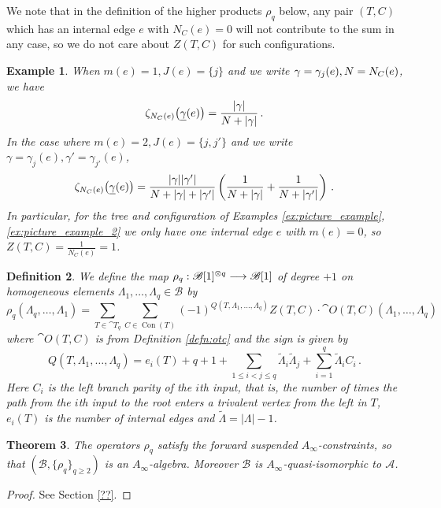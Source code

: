 \documentclass[english,letter paper,12pt,leqno]{article}
\newtheorem{theorem}{Theorem}[section]
\theoremstyle{example}
\newtheorem{definition}[theorem]{Definition}
\newtheorem{example}[theorem]{Example}
\numberwithin{equation}{section}
\def\be{\begin{equation}}
\def\ee{\end{equation}}
\begin{document}
We note that in the definition of the higher products $\rho_q$ below, any pair $(T,C)$ which has an internal edge $e$ with $N_C(e) = 0$ will not contribute to the sum in any case, so we do not care about $Z(T,C)$ for such configurations.

\begin{example} When $m(e) = 1, J(e) = \{ j \}$ and we write $\gamma = \gamma_j(e), N = N_C(e)$, we have
\[
\zeta_{N_C(e)}\big( \underline{\gamma}(e) \big) = \frac{|\gamma|}{N + |\gamma|}\,.
\]
In the case where $m(e) = 2, J(e) = \{ j, j' \}$ and we write $\gamma = \gamma_j(e), \gamma' = \gamma_{j'}(e)$,
\[
\zeta_{N_C(e)}\big( \underline{\gamma}(e) \big) = \frac{|\gamma||\gamma'|}{N + |\gamma| + |\gamma'|} \left( \frac{1}{N + |\gamma|}  + \frac{1}{N + |\gamma'|}\right)\,.
\]
In particular, for the tree and configuration of Examples \ref{ex:picture_example}, \ref{ex:picture_example_2} we only have one internal edge $e$ with $m(e) = 0$, so $Z(T,C) = \frac{1}{N_C(e)} = 1$.
\end{example}

\begin{definition}\label{defn:bainf} We define the map $\rho_q: \mathscr{B}[1]^{\otimes q} \longrightarrow \mathscr{B}[1]$ of degree $+1$ on homogeneous elements $\Lambda_1,\ldots,\Lambda_q \in \mathscr{B}$ by
\[
\rho_q( \Lambda_q, \ldots, \Lambda_1 ) = \sum_{T \in \cat{T}_q} \sum_{C \in \operatorname{Con}(T)} (-1)^{Q(T, \Lambda_1, \ldots, \Lambda_q)} Z(T,C) \cdot \cat{O}(T, C)( \Lambda_1, \ldots, \Lambda_q )
\]
where $\cat{O}(T,C)$ is from Definition \ref{defn:otc} and the sign is given by
\be\label{eq:defnQsign}
Q(T, \Lambda_1, \ldots, \Lambda_q) = e_i(T) + q + 1 + \sum_{1 \le i < j \le q} \widetilde{\Lambda}_i \widetilde{\Lambda}_j + \sum_{i=1}^q \widetilde{\Lambda}_i C_i\,.
\ee
Here $C_i$ is the \emph{left branch parity} of the $i$th input, that is, the number of times the path from the $i$th input to the root enters a trivalent vertex from the left in $T$, $e_i(T)$ is the number of internal edges and $\widetilde{\Lambda} = |\Lambda| - 1$.
\end{definition}

\begin{theorem} The operators $\rho_q$ satisfy the forward suspended $A_\infty$-constraints, so that $(\mathscr{B}, \{ \rho_q \}_{q \ge 2})$ is an $A_\infty$-algebra. Moreover $\mathscr{B}$ is $A_\infty$-quasi-isomorphic to $\mathscr{A}$.
\end{theorem}
\begin{proof}
See Section \ref{??}.
\end{proof}
\end{document}
